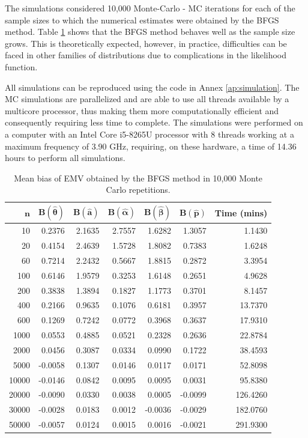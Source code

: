 \documentclass[12pt,a4paper]{article} %
\begin{document}
The simulations considered 10,000 Monte-Carlo - MC iterations for each of the sample sizes to which the numerical estimates were obtained by the BFGS method. Table \ref{tab:bias} shows that the BFGS method behaves well as the sample size grows. This is theoretically expected, however, in practice, difficulties can be faced in other families of distributions due to complications in the likelihood function.

All simulations can be reproduced using the code in Annex \ref {ap:simulation}. The MC simulations are parallelized and are able to use all threads available by a multicore processor, thus making them more computationally efficient and consequently requiring less time to complete. The simulations were performed on a computer with an Intel Core i5-8265U processor with 8 threads working at a maximum frequency of 3.90 GHz, requiring, on these hardware, a time of 14.36 hours to perform all simulations.

\begin{table}[H]
	\centering
	\caption{Mean bias of EMV obtained by the BFGS method in 10,000 Monte Carlo repetitions.} \label{tab:bias}
	\begin{tabular}{rrrrrrr}
		\hline
		$\bm n$ & $\bm B(\bm \hat{\bm \theta})$ & $\bm B(\bm \hat{\bm a})$ & $\bm B(\bm \hat{\bm \alpha})$ & $\bm B(\bm \hat{\bm \beta})$ & $\bm B(\bm \hat{\bm p})$ & \textbf{Time (mins)}\\ 
		\hline
		10 & 0.2376 & 2.1635 & 2.7557 & 1.6282 & 1.3057 & 1.1430\\ 
		20 & 0.4154 & 2.4639 & 1.5728 & 1.8082 & 0.7383 & 1.6248\\ 
		60 & 0.7214 & 2.2432 & 0.5667 & 1.8815 & 0.2872 & 3.3954\\ 
		100 & 0.6146 & 1.9579 & 0.3253 & 1.6148 & 0.2651 & 4.9628\\ 
		200 & 0.3838 & 1.3894 & 0.1827 & 1.1773 & 0.3701 & 8.1457\\ 
		400 & 0.2166 & 0.9635 & 0.1076 & 0.6181 & 0.3957 & 13.7370\\ 
		600 & 0.1269 & 0.7242 & 0.0772 & 0.3968 & 0.3637 & 17.9310\\ 
		1000 & 0.0553 & 0.4885 & 0.0521 & 0.2328 & 0.2636 & 22.8784 \\
		2000  &  0.0456 & 0.3087 &  0.0334 &  0.0990 & 0.1722 &  38.4593\\
		5000 & -0.0058 & 0.1307 & 0.0146 & 0.0117 & 0.0171 & 52.8098\\ 
		10000 & -0.0146 & 0.0842 & 0.0095 & 0.0095 & 0.0031 & 95.8380\\ 
		20000 & -0.0090 & 0.0330 & 0.0038 & 0.0005 & -0.0099 & 126.4260\\ 
		30000 & -0.0028 & 0.0183 & 0.0012 & -0.0036 & -0.0029 & 182.0760\\ 
		50000 & -0.0057 & 0.0124 & 0.0015 & 0.0016 & -0.0021 & 291.9300\\ 
		\hline
	\end{tabular}
\end{table}
\end{document}
